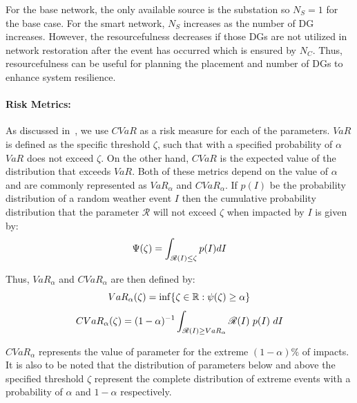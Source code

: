 For the base network, the only available source is the substation so $N_{S} = 1$ for the base case. For the smart network, $N_{S}$ increases as the number of DG increases. However, the resourcefulness decreases if those DGs are not utilized in network restoration after the event has occurred which is ensured by $N_C$. Thus, resourcefulness can be useful for planning the placement and number of DGs to enhance system resilience.

\paragraph{Risk Metrics:}

As discussed in~\cite{poudel2019risk}, we use $CVaR$ as a risk measure for each of the parameters. $VaR$ is defined as the specific threshold $\zeta$, such that with a specified probability of $\alpha$ $VaR$ does not exceed $\zeta$. On the other hand, $CVaR$ is the expected value of the distribution that exceeds $VaR$. Both of these metrics depend on the value of $\alpha$ and are commonly represented as $VaR_\alpha$ and $CVaR_\alpha$. If $p(I)$ be the probability distribution of a random weather event $I$ then the cumulative probability distribution that the parameter $\mathcal{R}$ will not exceed $\zeta$ when impacted by $I$ is given by:
\vspace{-5pt}
\begin{equation} \small
    \Psi (\zeta) = \int_{\mathcal{R}(I)\leq \zeta }^{} p(I) dI
\end{equation}

\noindent Thus, $VaR_\alpha$ and $CVaR_\alpha$ are then defined by:
\vspace{-5pt}
\begin{equation} \small
    VaR_\alpha (\zeta) = \inf\{\zeta \in \mathbb{R}:\psi(\zeta)\geq \alpha\}
    \label{eq:var}
\end{equation}
\vspace{-10pt}
\begin{equation} \small
    CVaR_{\alpha} (\zeta) = (1-\alpha)^{-1}\int_{\mathcal{R}(I)\geq VaR_{\alpha} }^{} \mathcal{R}(I)\ p(I)\ dI
    \label{eq:cvar}
\end{equation}

\noindent $CVaR_\alpha$ represents the value of parameter for the extreme $(1-\alpha)\%$ of impacts. It is also to be noted that the distribution of parameters below and above the specified threshold $\zeta$ represent the complete distribution of extreme events with a probability of $\alpha$ and $1-\alpha$ respectively.

